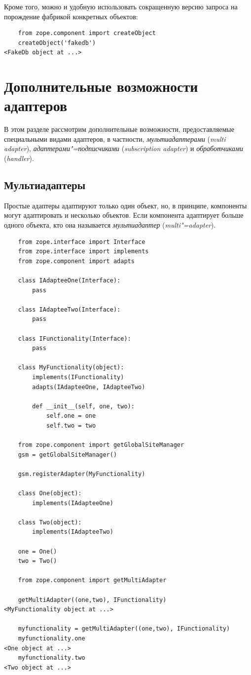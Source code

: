 \documentclass[a4paper,openany,twoside,final]{book}
\providecommand*{\DUroletitlereference}[1]{\textsl{#1}}
\begin{document}
Кроме того, можно и удобную использовать сокращенную версию запроса на порождение фабрикой конкретных объектов:

\begin{verbatim}
    from zope.component import createObject
    createObject('fakedb')
<FakeDb object at ...>
\end{verbatim}


\chapter{Дополнительные возможности адаптеров%
  \label{id44}%
}

В этом разделе рассмотрим дополнительные возможности, предоставляемые специальными видами адаптеров, в частности, \DUroletitlereference{мультиадаптерами} (\DUroletitlereference{multi adapter}), \DUroletitlereference{адаптерами"=подписчиками} (\DUroletitlereference{subscription adapter}) и \DUroletitlereference{обработчиками} (\DUroletitlereference{handler}).


\section{Мультиадаптеры%
  \label{id45}%
}

Простые адаптеры адаптируют только один объект, но, в принципе, компоненты могут адаптировать и несколько объектов.  Если компонента адаптирует больше одного объекта, кто она называется \DUroletitlereference{мультиадаптер} (\DUroletitlereference{multi"=adapter}).

\begin{verbatim}
    from zope.interface import Interface
    from zope.interface import implements
    from zope.component import adapts

    class IAdapteeOne(Interface):
        pass

    class IAdapteeTwo(Interface):
        pass

    class IFunctionality(Interface):
        pass

    class MyFunctionality(object):
        implements(IFunctionality)
        adapts(IAdapteeOne, IAdapteeTwo)

        def __init__(self, one, two):
            self.one = one
            self.two = two

    from zope.component import getGlobalSiteManager
    gsm = getGlobalSiteManager()

    gsm.registerAdapter(MyFunctionality)

    class One(object):
        implements(IAdapteeOne)

    class Two(object):
        implements(IAdapteeTwo)

    one = One()
    two = Two()

    from zope.component import getMultiAdapter

    getMultiAdapter((one,two), IFunctionality)
<MyFunctionality object at ...>

    myfunctionality = getMultiAdapter((one,two), IFunctionality)
    myfunctionality.one
<One object at ...>
    myfunctionality.two
<Two object at ...>
\end{verbatim}
\end{document}
